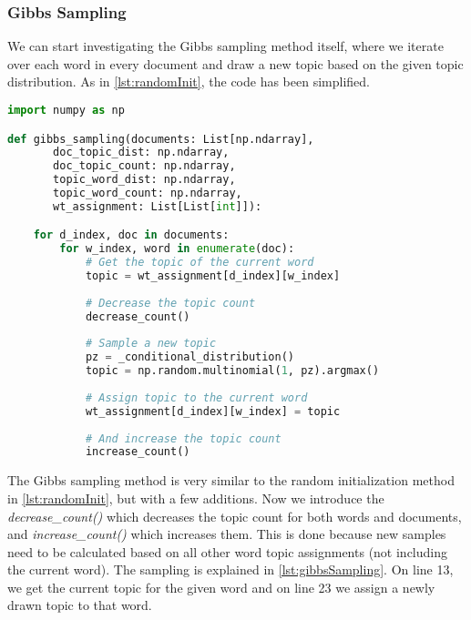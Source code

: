\subsubsection{Gibbs Sampling}
We can start investigating the Gibbs sampling method itself, where we iterate over each word in every document and draw a new topic based on the given topic distribution.
As in \autoref{lst:randomInit}, the code has been simplified.
\begin{lstlisting}[language=Python, caption=The Gibbs Sampling Method.,label={lst:gibbsSampling}, float, floatplacement=H]
import numpy as np

def gibbs_sampling(documents: List[np.ndarray],
	   doc_topic_dist: np.ndarray,
	   doc_topic_count: np.ndarray,
	   topic_word_dist: np.ndarray,
	   topic_word_count: np.ndarray,
	   wt_assignment: List[List[int]]):

	for d_index, doc in documents:
		for w_index, word in enumerate(doc):
			# Get the topic of the current word
			topic = wt_assignment[d_index][w_index]
			
			# Decrease the topic count
			decrease_count()
			
			# Sample a new topic
			pz = _conditional_distribution()
			topic = np.random.multinomial(1, pz).argmax()
			
			# Assign topic to the current word
			wt_assignment[d_index][w_index] = topic
			
			# And increase the topic count
			increase_count()
\end{lstlisting}
The Gibbs sampling method is very similar to the random initialization method in \autoref{lst:randomInit}, but with a few additions. 
Now we introduce the \emph{decrease\_count()} which decreases the topic count for both words and documents, and  \emph{increase\_count()} which increases them.
This is done because new samples need to be calculated based on all other word topic assignments (not including the current word).
The sampling is explained in \autoref{lst:gibbsSampling}.
On line 13, we get the current topic for the given word and on line 23 we assign a newly drawn topic to that word.

